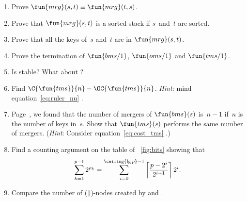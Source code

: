 \begin{enumerate}

  \item Prove \(\fun{mrg}(s,t) \equiv \fun{mrg}(t,s)\).

  \item Prove that \(\fun{mrg}(s,t)\) is a sorted
  stack if \(s\)~and~\(t\) are sorted.

  \item Prove that all the keys of~\(s\) and~\(t\) are in
  \(\fun{mrg}(s,t)\).

  \item Prove the termination of \(\fun{bms/1}\), \(\fun{oms/1}\) and
    \(\fun{tms/1}\).

  \item Is  stable? What about ?

  \item Find \(\C{\fun{tms}}{n} - \OC{\fun{tms}}{n}\). \emph{Hint:}
    mind equation~\eqref{eq:ruler_nu} .

  \item Page~\pageref{eq:bms_merges}, we found that the number of
    mergers of \(\fun{bms}(s)\) is~\(n-1\) if~\(n\) is the number of
    keys in~\(s\). Show that \(\fun{tms}(s)\) performs the same number
    of mergers. (\emph{Hint}: Consider equation~\eqref{eq:cost_tms}
    .)

  \item Find a counting argument on the table of \fig~\vref{fig:bits}
    showing that
    \begin{equation*}
      \sum_{k=1}^{p-1}{2^{\rho_k}}
      = \sum_{i=0}^{\ceiling{\lg p}-1}%
      {\left\lceil\frac{p-2^i}{2^{i+1}}\right\rceil 2^i}.
    \end{equation*}

  \item Compare the number of (\texttt{|})-nodes created by
     and .

\end{enumerate}
